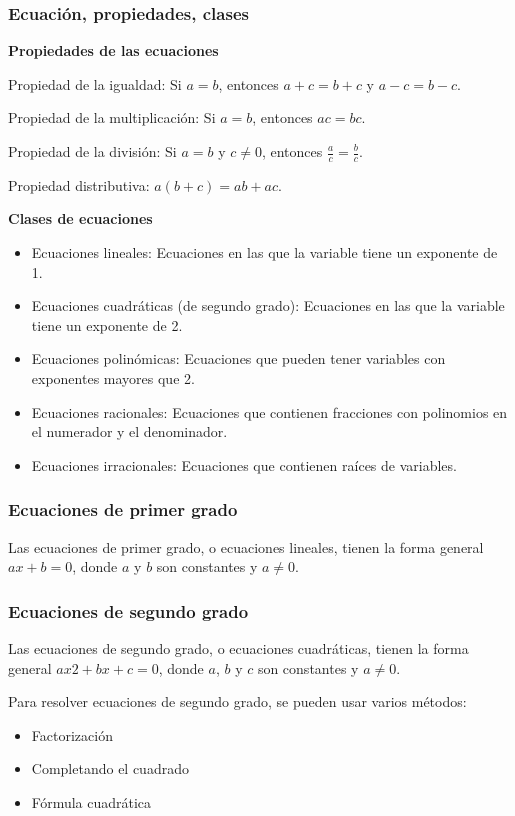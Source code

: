 \subsubsection{Ecuación, propiedades, clases}

\textbf{Propiedades de las ecuaciones}

Propiedad de la igualdad: Si $a=b$, entonces $a+c=b+c$ y $a-c=b-c$.

Propiedad de la multiplicación: Si $a=b$, entonces $ac=bc$.

Propiedad de la división: Si $a=b$ y $c \neq 0$, entonces $\frac{a}{c}=\frac{b}{c}$.

Propiedad distributiva: $a(b+c)=ab+ac$.

\textbf{Clases de ecuaciones}

\begin{itemize}
    \item Ecuaciones lineales: Ecuaciones en las que la variable tiene un exponente de 1.
    \item Ecuaciones cuadráticas (de segundo grado): Ecuaciones en las que la variable tiene un exponente de 2.
    \item Ecuaciones polinómicas: Ecuaciones que pueden tener variables con exponentes mayores que 2.
    \item Ecuaciones racionales: Ecuaciones que contienen fracciones con polinomios en el numerador y el denominador.
    \item Ecuaciones irracionales: Ecuaciones que contienen raíces de variables.
\end{itemize}


\subsubsection{Ecuaciones de primer grado}

Las ecuaciones de primer grado, o ecuaciones lineales, tienen la forma general $ax+b=0$, donde $a$ y $b$ son constantes y $a\neq0$.

\subsubsection{Ecuaciones de segundo grado}

Las ecuaciones de segundo grado, o ecuaciones cuadráticas, tienen la forma general $ax2+bx+c=0$, donde $a$, $b$ y $c$ son constantes y $a\neq0$.

Para resolver ecuaciones de segundo grado, se pueden usar varios métodos:
\begin{itemize}
    \item Factorización
    \item Completando el cuadrado
    \item Fórmula cuadrática
\end{itemize}

